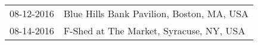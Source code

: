\begin{supertabular}{ll}
 08-12-2016 &  Blue Hills Bank Pavilion, Boston, MA, USA \\
 08-14-2016 &    F-Shed at The Market, Syracuse, NY, USA \\
\end{supertabular}
